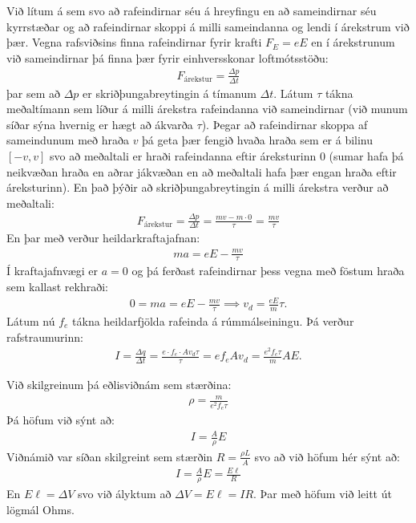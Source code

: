 Við lítum á sem svo að rafeindirnar séu á hreyfingu en að sameindirnar séu kyrrstæðar og að rafeindirnar skoppi á milli sameindanna og lendi í árekstrum við þær. Vegna rafsviðsins finna rafeindirnar fyrir krafti $F_E = eE$ en í árekstrunum við sameindirnar þá finna þær fyrir einhversskonar loftmótsstöðu:
\begin{align*}
    F_{\text{árekstur}} = \frac{\Delta p}{\Delta t}
\end{align*}
þar sem að $\Delta p$ er skriðþungabreytingin á tímanum $\Delta t$. Látum $\tau$ tákna meðaltímann sem líður á milli árekstra rafeindanna við sameindirnar (við munum síðar sýna hvernig er hægt að ákvarða $\tau$). Þegar að rafeindirnar skoppa af sameindunum með hraða $v$ þá geta þær fengið hvaða hraða sem er á bilinu $[-v,v]$ svo að meðaltali er hraði rafeindanna eftir áreksturinn $0$ (sumar hafa þá neikvæðan hraða en aðrar jákvæðan en að meðaltali hafa þær engan hraða eftir áreksturinn). En það þýðir að skriðþungabreytingin á milli 
árekstra verður að meðaltali:
\begin{align*}
    F_{\text{árekstur}} = \frac{\Delta p}{\Delta t} = \frac{mv - m \cdot 0}{\tau} = \frac{mv}{\tau}
\end{align*}
En þar með verður heildarkraftajafnan:
\begin{align*}
    ma = eE - \frac{mv}{\tau}
\end{align*}
Í kraftajafnvægi er $a = 0$ og þá ferðast rafeindirnar þess vegna með föstum hraða sem kallast rekhraði:
\begin{align*}
    0 = ma = eE - \frac{mv}{\tau} \implies v_d = \frac{eE}{m}\tau.
\end{align*}
Látum nú $f_e$ tákna heildarfjölda rafeinda á rúmmálseiningu. Þá verður rafstraumurinn:
\begin{align*}
    I = \frac{\Delta q}{\Delta t} = \frac{e \cdot f_e \cdot A v_d \tau}{\tau} = e f_e A v_d = \frac{e^2 f_e \tau}{m} A E.
\end{align*}

Við skilgreinum þá eðlisviðnám sem stærðina:
\begin{align*}
    \rho = \frac{m}{e^2 f_e \tau}
\end{align*}
Þá höfum við sýnt að:
\begin{align*}
    I = \frac{A}{\rho} E
\end{align*}
Viðnámið var síðan skilgreint sem stærðin $R = \frac{\rho L}{A}$ svo að við höfum hér sýnt að:
\begin{align*}
    I = \frac{A }{\rho} E = \frac{E \ell}{R}
\end{align*}
En $E \ell = \Delta V$ svo við ályktum að $\Delta V = E \ell = IR$. Þar með höfum við leitt út lögmál Ohms. \\

